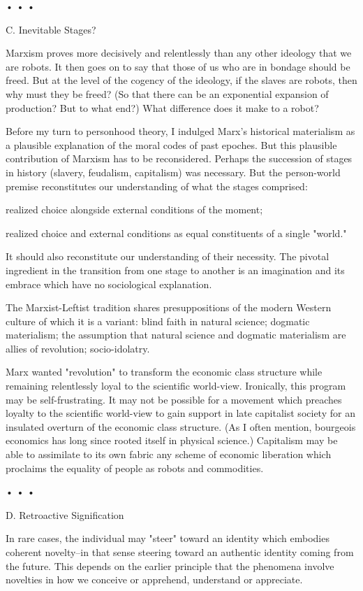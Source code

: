 \begin{enumerate}[label=\alph*.]
• • •

C. Inevitable Stages?

Marxism proves more decisively and relentlessly than any other ideology that we are robots. It then goes on to say that those of us who are in bondage should be freed. But at the level of the cogency of the ideology, if the slaves are robots, then why must they be freed? (So that there can be an exponential expansion of production? But to what end?) What difference does it make to a robot?

Before my turn to personhood theory, I indulged Marx’s historical materialism as a plausible explanation of the moral codes of past epoches. But this plausible contribution of Marxism has to be reconsidered. Perhaps the succession of stages in history (slavery, feudalism, capitalism) was necessary. But the person-world premise reconstitutes our understanding of what the stages comprised:

realized choice alongside external conditions of the moment;

realized choice and external conditions as equal constituents of a single "world."

It should also reconstitute our understanding of their necessity. The pivotal ingredient in the transition from one stage to another is an imagination and its embrace which have no sociological explanation.

The Marxist-Leftist tradition shares presuppositions of the modern Western culture of which it is a variant: blind faith in natural science; dogmatic materialism; the assumption that natural science and dogmatic materialism are allies of revolution; socio-idolatry.

Marx wanted "revolution" to transform the economic class structure while remaining relentlessly loyal to the scientific world-view. Ironically, this program may be self-frustrating. It may not be possible for a movement which preaches loyalty to the scientific world-view to gain support in late capitalist society for an insulated overturn of the economic class structure. (As I often mention, bourgeois economics has long since rooted itself in physical science.) Capitalism may be able to assimilate to its own fabric any scheme of economic liberation which proclaims the equality of people as robots and commodities.

• • •

D. Retroactive Signification

In rare cases, the individual may "steer" toward an identity which embodies coherent novelty–in that sense steering toward an authentic identity coming from the future. This depends on the earlier principle that the phenomena involve novelties in how we conceive or apprehend, understand or appreciate.


\end{enumerate}
